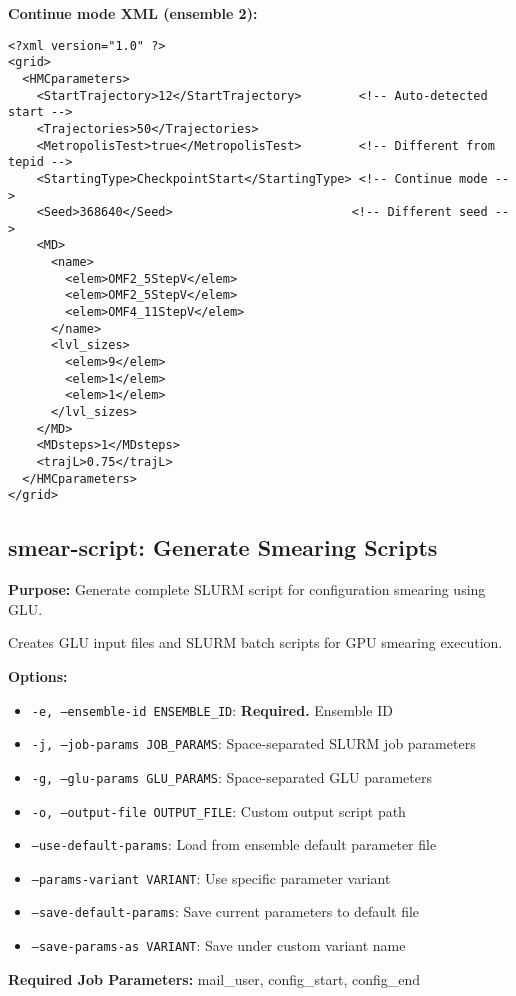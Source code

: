 \documentclass{article}
\begin{document}
\textbf{Continue mode XML (ensemble 2):}
\begin{lstlisting}
<?xml version="1.0" ?>
<grid>
  <HMCparameters>
    <StartTrajectory>12</StartTrajectory>        <!-- Auto-detected start -->
    <Trajectories>50</Trajectories>
    <MetropolisTest>true</MetropolisTest>        <!-- Different from tepid -->
    <StartingType>CheckpointStart</StartingType> <!-- Continue mode -->
    <Seed>368640</Seed>                         <!-- Different seed -->
    <MD>
      <name>
        <elem>OMF2_5StepV</elem>
        <elem>OMF2_5StepV</elem>
        <elem>OMF4_11StepV</elem>
      </name>
      <lvl_sizes>
        <elem>9</elem>
        <elem>1</elem>
        <elem>1</elem>
      </lvl_sizes>
    </MD>
    <MDsteps>1</MDsteps>
    <trajL>0.75</trajL>
  </HMCparameters>
</grid>
\end{lstlisting}

\subsection{smear-script: Generate Smearing Scripts}

\textbf{Purpose:} Generate complete SLURM script for configuration smearing using GLU.

Creates GLU input files and SLURM batch scripts for GPU smearing execution.

\textbf{Options:}
\begin{itemize}
\item \texttt{-e, --ensemble-id ENSEMBLE\_ID}: \textbf{Required.} Ensemble ID
\item \texttt{-j, --job-params JOB\_PARAMS}: Space-separated SLURM job parameters
\item \texttt{-g, --glu-params GLU\_PARAMS}: Space-separated GLU parameters
\item \texttt{-o, --output-file OUTPUT\_FILE}: Custom output script path
\item \texttt{--use-default-params}: Load from ensemble default parameter file
\item \texttt{--params-variant VARIANT}: Use specific parameter variant
\item \texttt{--save-default-params}: Save current parameters to default file  
\item \texttt{--save-params-as VARIANT}: Save under custom variant name
\end{itemize}

\textbf{Required Job Parameters:}
mail\_user, config\_start, config\_end
\end{document}
